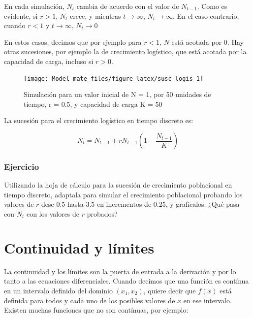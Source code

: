 \documentclass[
]{book}
\begin{document}
En cada simulación, \(N_t\) cambia de acuerdo con el valor de \(N_{t-1}\). Como es evidente, si \(r > 1\), \(N_t\) crece, y mientras \(t \rightarrow \infty\), \(N_t \rightarrow \infty\). En el caso contrario, cuando \(r < 1\) y \(t \rightarrow \infty\), \(N_t \rightarrow 0\)

En estos casos, decimos que por ejemplo para \(r < 1\), \(N\) está acotada por \(0\). Hay otras sucesiones, por ejemplo la de crecimiento logístico, que está acotada por la capacidad de carga, incluso si \(r > 0\).

\begin{figure}

{\centering \texttt{[image: Model-mate\_files/figure-latex/susc-logis-1]} 

}

\caption{Simulación para un valor inicial de N = 1, por 50 unidades de tiempo, r = 0.5, y capacidad de carga K = 50}\label{fig:susc-logis}
\end{figure}

La sucesión para el crecimiento logístico en tiempo discreto es:

\begin{equation}
N_{t} = N_{t-1} + r N_{t-1} \left(1 - \frac{N_{t-1}}{K} \right) \label{eq:susc-logis}
\end{equation}

\hypertarget{ejercicio-3}{%
\subsubsection{Ejercicio}\label{ejercicio-3}}

Utilizando la hoja de cálculo para la sucesión de crecimiento poblacional en tiempo discreto, adaptala para simular el crecimiento poblacional probando los valores de \(r\) dese 0.5 hasta 3.5 en incrementos de 0.25, y grafícalos. ¿Qué pasa con \(N_t\) con los valores de \(r\) probados?

\hypertarget{continuidad-y-luxedmites}{%
\section{Continuidad y límites}\label{continuidad-y-luxedmites}}

La continuidad y los límites son la puerta de entrada a la derivación y por lo tanto a las ecuaciones diferenciales. Cuando decimos que una función es contínua en un intervalo definido del dominio \((x_1, x_2)\), quiere decir que \(f(x)\) está definida para todos y cada uno de los posibles valores de \(x\) en ese intervalo. Existen muchas funciones que no son contínuas, por ejemplo:
\end{document}
